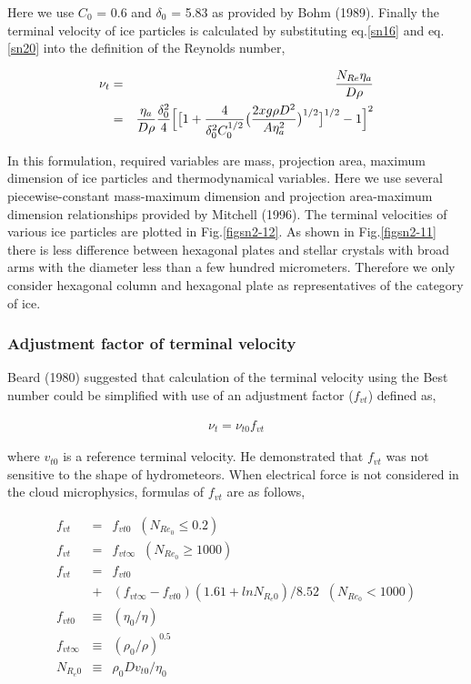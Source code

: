 Here we use $C_{0}$ = 0.6 and $\delta_{0}$ = 5.83 as provided by Bohm (1989). Finally the terminal velocity of ice particles is calculated by substituting eq.\ref{sn16} and eq.\ref{sn20} into the definition of the Reynolds number,

\begin{eqnarray}
\nu_{t}&=&\frac{N_{Re}\eta_{a}}{D\rho}\nonumber\\
&=&\frac{\eta_{a}}{D\rho}\frac{\delta_{0}^{2}}{4}\Bigl[\bigl[1+\frac{4}{\delta_{0}^{2}C_{0}^{1/2}}\bigr(\frac{2xg\rho D^{2}}{A\eta_{a}^{2}}\bigl)^{1/2}\bigr]^{1/2}-1\Bigr]^{2}
\label{sn21}
\end{eqnarray}

In this formulation, required variables are mass, projection area, maximum dimension of ice particles and thermodynamical variables. Here we use several piecewise-constant mass-maximum dimension and projection area-maximum dimension relationships provided by Mitchell (1996). The terminal velocities of various ice particles are plotted in Fig.\ref{figsn2-12}. As shown in Fig.\ref{figsn2-11} there is less difference between hexagonal plates and stellar crystals with broad arms with the diameter less than a few hundred micrometers. Therefore we only consider hexagonal column and hexagonal plate as representatives of the category of ice.


\subsubsection{Adjustment factor of terminal velocity}
Beard (1980) suggested that calculation of the terminal velocity using the Best number could be simplified with use of an adjustment factor ($f_{vt}$) defined as,

\begin{eqnarray}
\nu_{t}=\nu_{t0}f_{vt}
\label{sn23}
\end{eqnarray}

where $v_{t0}$ is a reference terminal velocity. He demonstrated that $f_{vt}$ was not sensitive to the shape of hydrometeors. When electrical force is not considered in the cloud microphysics, formulas of $f_{vt}$ are as follows,

\begin{eqnarray}
f_{vt}&=&f_{vt0}\;\;(N_{Re_{0}}\leq0.2)\label{sn24}\\
f_{vt}&=&f_{vt\infty}\;\;(N_{Re_{0}}\geq1000)\label{sn25}\\
f_{vt}&=&f_{vt0}\nonumber\\
&+&(f_{vt\infty}-f_{vt0})(1.61+lnN_{R_{e}0})/8.52\;\;(N_{Re_{0}}<1000)\label{sn26}\\
f_{vt0}&\equiv&(\eta_{0}/\eta)\label{sn27}\\
f_{vt\infty}&\equiv&(\rho_{0}/\rho)^{0.5}\label{sn28}\\
N_{R_{e}0}&\equiv&\rho_{0}Dv_{t0}/\eta_{0}\label{sn29}
\end{eqnarray}

